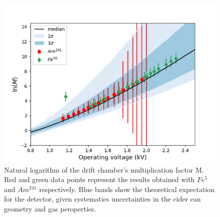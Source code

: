 \begin{figure}[H]
  \includegraphics[width=\textwidth]{graphics/lnM_final_plot.png}
  \caption{Natural logarithm of the drift chamber's multiplication factor M. Red and green data points represent the results obtained with $Fe^{5}$ and $Am^{241}$ respectively. Blue bands show the theoretical expectation for the detector, given systematics uncertainties in the cider can geometry and gas peroperties.}
  \label{final_lnm}
\end{figure}

